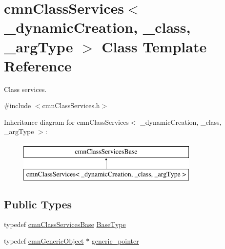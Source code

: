 \hypertarget{classcmn_class_services}{\section{cmn\-Class\-Services$<$ \-\_\-dynamic\-Creation, \-\_\-class, \-\_\-arg\-Type $>$ Class Template Reference}
\label{classcmn_class_services}
}


Class services.  




{\ttfamily \#include $<$cmn\-Class\-Services.\-h$>$}

Inheritance diagram for cmn\-Class\-Services$<$ \-\_\-dynamic\-Creation, \-\_\-class, \-\_\-arg\-Type $>$\-:\begin{figure}[H]
\begin{center}
\leavevmode
\includegraphics[height=2.000000cm]{d4/d17/classcmn_class_services}
\end{center}
\end{figure}
\subsection*{Public Types}
\begin{DoxyCompactItemize}
\item 
typedef \hyperlink{classcmn_class_services_base}{cmn\-Class\-Services\-Base} \hyperlink{classcmn_class_services_a0c7e37600cf4dfa19bc34abe57cb13ea}{Base\-Type}
\item 
typedef \hyperlink{classcmn_generic_object}{cmn\-Generic\-Object} $\ast$ \hyperlink{classcmn_class_services_a350752158d6ffa3f741bcef03177f230}{generic\-\_\-pointer}
\end{DoxyCompactItemize}
